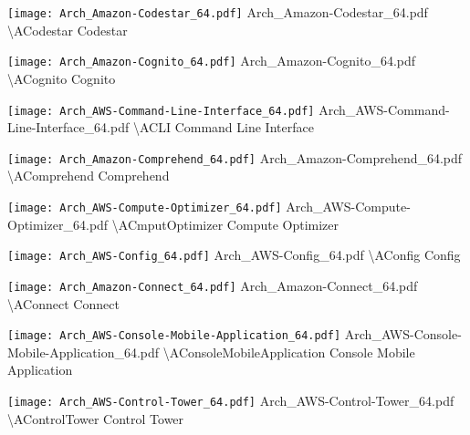  {\texttt{[image: Arch\_Amazon-Codestar\_64.pdf]}} {Arch\_Amazon-Codestar\_64.pdf} {{\textbackslash}ACodestar} {Codestar}

 {\texttt{[image: Arch\_Amazon-Cognito\_64.pdf]}} {Arch\_Amazon-Cognito\_64.pdf} {{\textbackslash}ACognito} {Cognito}

 {\texttt{[image: Arch\_AWS-Command-Line-Interface\_64.pdf]}} {Arch\_AWS-Command-Line-Interface\_64.pdf} {{\textbackslash}ACLI} {Command Line Interface}

 {\texttt{[image: Arch\_Amazon-Comprehend\_64.pdf]}} {Arch\_Amazon-Comprehend\_64.pdf} {{\textbackslash}AComprehend} {Comprehend}

 {\texttt{[image: Arch\_AWS-Compute-Optimizer\_64.pdf]}} {Arch\_AWS-Compute-Optimizer\_64.pdf} {{\textbackslash}ACmputOptimizer} {Compute Optimizer}

 {\texttt{[image: Arch\_AWS-Config\_64.pdf]}} {Arch\_AWS-Config\_64.pdf} {{\textbackslash}AConfig} {Config}

 {\texttt{[image: Arch\_Amazon-Connect\_64.pdf]}} {Arch\_Amazon-Connect\_64.pdf} {{\textbackslash}AConnect} {Connect}

 {\texttt{[image: Arch\_AWS-Console-Mobile-Application\_64.pdf]}} {Arch\_AWS-Console-Mobile-Application\_64.pdf} {{\textbackslash}AConsoleMobileApplication} {Console Mobile Application}

 {\texttt{[image: Arch\_AWS-Control-Tower\_64.pdf]}} {Arch\_AWS-Control-Tower\_64.pdf} {{\textbackslash}AControlTower} {Control Tower}

